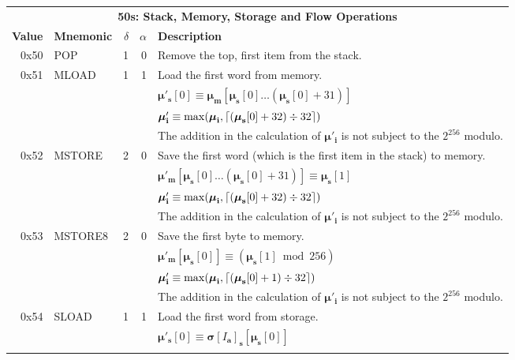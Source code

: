 \documentclass[9pt,oneside]{amsart}
\DeclarePairedDelimiter{\ceil}{\lceil}{\rceil}
\begin{document}
\begin{tabularx}{\textwidth}{rlrrX}
\toprule
\multicolumn{5}{c}{\textbf{50s: Stack, Memory, Storage and Flow Operations}} \vspace{5pt} \\
\textbf{Value} & \textbf{Mnemonic} & $\delta$ & $\alpha$ & \textbf{Description} \vspace{5pt} \\
0x50 & {\small POP} & 1 & 0 & Remove the top, first item from the stack. \\
\midrule
0x51 & {\small MLOAD} & 1 & 1 & Load the first word from memory. \\
&&&& $\boldsymbol{\mu}'_\mathbf{s}[0] \equiv \boldsymbol{\mu}_\mathbf{m}[\boldsymbol{\mu}_\mathbf{s}[0] \dots (\boldsymbol{\mu}_\mathbf{s}[0] + 31) ]$ \\
&&&& $\boldsymbol{\mu}'_\mathbf{i} \equiv \max(\boldsymbol{\mu}_\mathbf{i}, \ceil{ (\boldsymbol{\mu}_\mathbf{s}[0] + 32) \div 32 })$ \\
&&&& The addition in the calculation of $\boldsymbol{\mu}'_\mathbf{i}$ is not subject to the $2^{256}$ modulo. \\
\midrule
0x52 & {\small MSTORE} & 2 & 0 & Save the first word (which is the first item in the stack) to memory. \\
&&&& $\boldsymbol{\mu}'_\mathbf{m}[ \boldsymbol{\mu}_\mathbf{s}[0] \dots (\boldsymbol{\mu}_\mathbf{s}[0] + 31) ] \equiv \boldsymbol{\mu}_\mathbf{s}[1]$ \\
&&&& $\boldsymbol{\mu}'_\mathbf{i} \equiv \max(\boldsymbol{\mu}_\mathbf{i}, \ceil{ (\boldsymbol{\mu}_\mathbf{s}[0] + 32) \div 32 })$ \\
&&&& The addition in the calculation of $\boldsymbol{\mu}'_\mathbf{i}$ is not subject to the $2^{256}$ modulo. \\
\midrule
0x53 & {\small MSTORE8} & 2 & 0 & Save the first byte to memory. \\
&&&& $\boldsymbol{\mu}'_\mathbf{m}[ \boldsymbol{\mu}_\mathbf{s}[0] ] \equiv (\boldsymbol{\mu}_\mathbf{s}[1] \bmod 256) $ \\
&&&& $\boldsymbol{\mu}'_\mathbf{i} \equiv \max(\boldsymbol{\mu}_\mathbf{i}, \ceil{ (\boldsymbol{\mu}_\mathbf{s}[0] + 1) \div 32 })$ \\
&&&& The addition in the calculation of $\boldsymbol{\mu}'_\mathbf{i}$ is not subject to the $2^{256}$ modulo. \\
\midrule
0x54 & {\small SLOAD} & 1 & 1 & Load the first word from storage. \\
&&&& $\boldsymbol{\mu}'_\mathbf{s}[0] \equiv \boldsymbol{\sigma}[I_\mathbf{a}]_\mathbf{s}[\boldsymbol{\mu}_\mathbf{s}[0]]$ \hypertarget{SSTORE}{\\
}
\end{tabularx}
\end{document}
